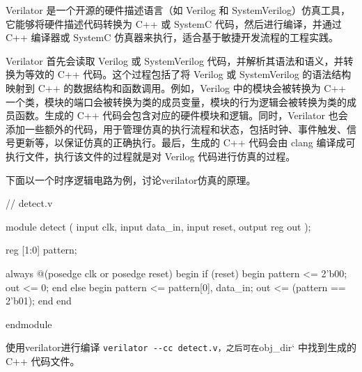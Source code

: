 Verilator 是一个开源的硬件描述语言（如 Verilog 和 SystemVerilog）仿真工具，它能够将硬件描述代码转换为 C++ 或 SystemC 代码，然后进行编译，并通过 C++ 编译器或 SystemC 仿真器来执行，适合基于敏捷开发流程的工程实践。

Verilator 首先会读取 Verilog 或 SystemVerilog 代码，并解析其语法和语义，并转换为等效的 C++ 代码。这个过程包括了将 Verilog 或 SystemVerilog 的语法结构映射到 C++ 的数据结构和函数调用。例如，Verilog 中的模块会被转换为 C++ 一个类，模块的端口会被转换为类的成员变量，模块的行为逻辑会被转换为类的成员函数。生成的 C++ 代码会包含对应的硬件模块和逻辑。同时，Verilator 也会添加一些额外的代码，用于管理仿真的执行流程和状态，包括时钟、事件触发、信号更新等，以保证仿真的正确执行。最后，生成的 C++ 代码会由 clang 编译成可执行文件，执行该文件的过程就是对 Verilog 代码进行仿真的过程。

下面以一个时序逻辑电路为例，讨论verilator仿真的原理。

\begin{CodeBlock}[language=BookVerilog]
// detect.v

module detect (
    input clk,
    input data_in,
    input reset,
    output reg out
);

reg [1:0] pattern;

always @(posedge clk or posedge reset) begin
    if (reset) begin
        pattern <= 2'b00;
        out <= 0;
    end else begin
        pattern <= {pattern[0], data_in};
        out <= (pattern == 2'b01);
    end
end

endmodule
\end{CodeBlock}

使用verilator进行编译 \texttt{verilator\ -\/-cc\ detect.v，之后可在}obj\_dir` 中找到生成的 C++ 代码文件。

